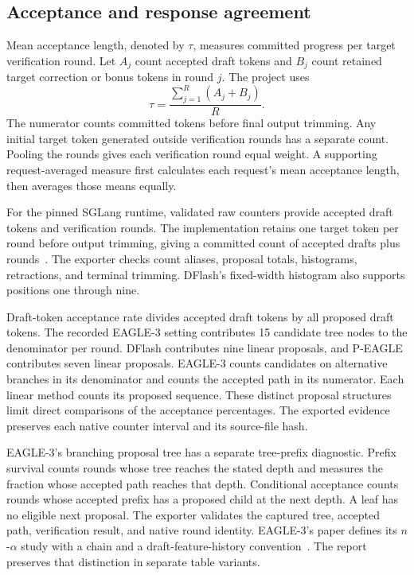 \documentclass[conference,onecolumn]{IEEEtran}
\begin{document}
\subsection{Acceptance and response agreement}
Mean acceptance length, denoted by $\tau$, measures committed progress per target verification round. Let $A_j$ count accepted draft tokens and $B_j$ count retained target correction or bonus tokens in round $j$. The project uses
\begin{equation}
\tau = \frac{\sum_{j=1}^{R}(A_j+B_j)}{R}.
\end{equation}
The numerator counts committed tokens before final output trimming. Any initial target token generated outside verification rounds has a separate count. Pooling the rounds gives each verification round equal weight. A supporting request-averaged measure first calculates each request's mean acceptance length, then averages those means equally.

For the pinned SGLang runtime, validated raw counters provide accepted draft tokens and verification rounds. The implementation retains one target token per round before output trimming, giving a committed count of accepted drafts plus rounds~\cite{sglangsource}. The exporter checks count aliases, proposal totals, histograms, retractions, and terminal trimming. DFlash's fixed-width histogram also supports positions one through nine.

Draft-token acceptance rate divides accepted draft tokens by all proposed draft tokens. The recorded EAGLE-3 setting contributes 15 candidate tree nodes to the denominator per round. DFlash contributes nine linear proposals, and P-EAGLE contributes seven linear proposals. EAGLE-3 counts candidates on alternative branches in its denominator and counts the accepted path in its numerator. Each linear method counts its proposed sequence. These distinct proposal structures limit direct comparisons of the acceptance percentages. The exported evidence preserves each native counter interval and its source-file hash.

EAGLE-3's branching proposal tree has a separate tree-prefix diagnostic. Prefix survival counts rounds whose tree reaches the stated depth and measures the fraction whose accepted path reaches that depth. Conditional acceptance counts rounds whose accepted prefix has a proposed child at the next depth. A leaf has no eligible next proposal. The exporter validates the captured tree, accepted path, verification result, and native round identity. EAGLE-3's paper defines its $n$-$\alpha$ study with a chain and a draft-feature-history convention~\cite{eagle3}. The report preserves that distinction in separate table variants.
\end{document}
